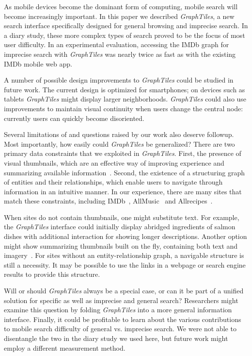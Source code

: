 As mobile devices become the dominant form of computing, mobile search will become increasingly important. In this paper we described \textit{GraphTiles}, a new search interface specifically designed for general browsing and imprecise search. In a diary study, these more complex types of search proved to be the focus of most user difficulty. In an experimental evaluation, accessing the IMDb graph for imprecise search with \textit{GraphTiles} was nearly twice as fast as with the existing IMDb mobile web app.

A number of possible design improvements to \textit{GraphTiles} could be studied in future work. The current design is optimized for smartphones; on devices such as tablets \textit{GraphTiles} might display larger neighborhoods. \textit{GraphTiles} could also use improvements to maintain visual continuity when users change the central node: currently users can quickly become disoriented. 

Several limitations of and questions raised by our work also deserve followup. Most importantly, how easily could \textit{GraphTiles} be generalized?  There are two primary data constraints that we exploited in \textit{GraphTiles}. First, the presence of visual thumbnails, which are an effective way of improving experience and summarizing available information~\cite{Setlur:2011}. Second, the existence of a structuring graph of entities and their relationships, which enable users to navigate through information in an intuitive manner. In our experience, there are many sites that match these constraints, including IMDb~\cite{imdb}, AllMusic~\cite{allmusic} and Allrecipes~\cite{allrecipes}. 

When sites do not contain thumbnails, one might substitute text. For example, the \textit{GraphTiles} interface could initially display abridged ingredients of salmon dishes with additional interaction for showing longer descriptions. Another option might show summarizing thumbnails built on the fly, containing both text and imagery~\cite{Setlur:2011}. For sites without an entity-relationship graph, a navigable structure is still a necessity. It may be possible to use the links in a webpage or search engine results to provide this structure.

Will or should \textit{GraphTiles} always be a special case, or can it be part of a unified solution for specific as well as imprecise and general search? Researchers might examine this question by folding \textit{GraphTiles} into a more general information interface. Finally, it could be profitable to learn about the various contributions to mobile search difficulty of general vs. imprecise search. We were not able to disentangle the two in the diary study we used here, but future work might employ a different measurement method.

